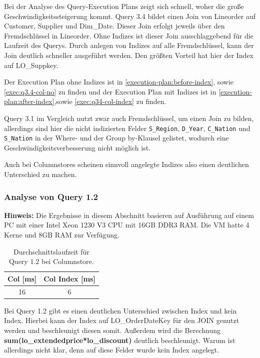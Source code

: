 Bei der Analyse des Query-Execution Plans zeigt sich schnell,
woher die große Geschwindigkeitssteigerung kommt.
Query 3.4 bildet einen Join von Lineorder auf Customer,
Supplier und Dim\_Date. 
Dieser Join erfolgt jeweils über den Fremdschlüssel in Lineorder.
Ohne Indizes ist dieser Join ausschlaggebend für die Laufzeit des Querys.
Durch anlegen von Indizes auf alle Fremdschlüssel,
kann der Join deutlich schneller ausgeführt werden.
Den größten Vorteil hat hier der Index auf LO\_Suppkey.

Der Execution Plan ohne Indizes ist in \autoref{execution-plan:before-index}, sowie \autoref{exec:q3.4-col-no}
zu finden und der Execution Plan mit Indizes ist in \autoref{execution-plan:after-index},sowie \autoref{exec:q34-col-index} zu finden.

Query 3.1 im Vergleich nutzt zwar auch Fremdschlüssel, um einen Join zu bilden,
allerdings sind hier die nicht indizierten Felder \verb+S_Region+, \verb+D_Year+,
\verb+C_Nation+ und \verb+S_Nation+ in der Where- und der Group by-Klausel gelistet,
wodurch eine Geschwindigkeitsverbesserung nicht möglich ist.

Auch bei Columnstores scheinen sinnvoll angelegte Indizes also einen deutlichen Unterschied zu machen.

\subsubsection{Analyse von Query 1.2}
\textbf{Hinweis:} Die Ergebnisse in diesem Abschnitt basieren auf Ausführung auf einem PC mit einer Intel Xeon 1230 V3 CPU mit 16GB DDR3 RAM. Die VM hatte 4 Kerne und 8GB RAM zur Verfügung.

\setlength\intextsep{0pt}
\begin{table}
    \centering
    \begin{tabular}{cc}
        Col [ms]       & Col Index [ms]    \\
        \toprule
         16          & 6         \\   
    \end{tabular}
	\caption{Durchschnittslaufzeit für Query 1.2 bei Columnstore.}
    \label{tab:olap_q12}
\end{table}

Bei Query 1.2 gibt es einen deutlichen Unterschied zwischen Index und kein Index. Hierbei kann der Index auf LO\_OrderDateKey für den JOIN genutzt werden und beschleunigt diesen somit.
Außerdem wird die Berechnung \textbf{sum(lo\_extendedprice*lo\_discount)} deutlich beschleunigt. Warum ist allerdings nicht klar, denn auf diese Felder wurde kein Index angelegt.


